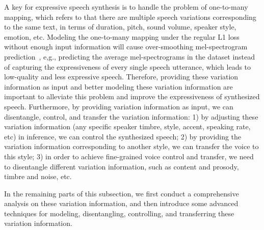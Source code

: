 \documentclass{article}
\begin{document}
A key for expressive speech synthesis is to handle the problem of one-to-many mapping, which refers to that there are multiple speech variations corresponding to the same text, in terms of duration, pitch, sound volume, speaker style, emotion, etc. Modeling the one-to-many mapping under the regular L1 loss~\cite{gazor2003speech,usman2018probabilistic} without enough input information will cause over-smoothing mel-spectrogram prediction~\cite{toda2007speech,takamichi2016postfilters}, e,g., predicting the average mel-spectrograms in the dataset instead of capturing the expressiveness of every single speech utterance, which leads to low-quality and less expressive speech. Therefore, providing these variation information as input and better modeling these variation information are important to alleviate this problem and improve the expressiveness of synthesized speech. Furthermore, by providing variation information as input, we can disentangle, control, and transfer the variation information: 1) by adjusting these variation information (any specific speaker timbre, style, accent, speaking rate, etc) in inference, we can control the synthesized speech; 2) by providing the variation information corresponding to another style, we can transfer the voice to this style; 3) in order to achieve fine-grained voice control and transfer, we need to disentangle different variation information, such as content and prosody, timbre and noise, etc. 

In the remaining parts of this subsection, we first conduct a comprehensive analysis on these variation information, and then introduce some advanced techniques for modeling, disentangling, controlling, and transferring these variation information. 
\end{document}
